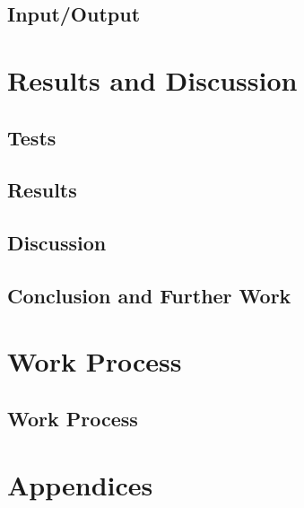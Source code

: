\documentclass{report}
\begin{document}
\chapter{Input/Output}
	

\part{Results and Discussion}

\chapter{Tests}
	

\chapter{Results}
	

\chapter{Discussion}
	

\chapter{Conclusion and Further Work}


\part{Work Process}


\chapter{Work Process}
	

\printindex
\printglossaries

\part{Appendices}
	



\nocite{*}
\end{document}
